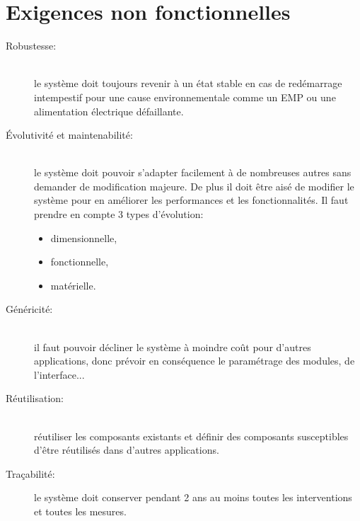 \section{Exigences non fonctionnelles}
    \begin{description}
        \item[Robustesse:]\hfill\\
            le système doit toujours revenir à un état
            stable en cas de redémarrage intempestif pour une cause
            environnementale comme un EMP ou une alimentation électrique
            défaillante.
    
        \item[Évolutivité et maintenabilité:]\hfill\\
            le système doit pouvoir
            s'adapter facilement à de nombreuses autres sans demander de
            modification majeure.
            De plus il doit être aisé de modifier le système pour en
            améliorer les performances et les fonctionnalités.
            Il faut prendre en compte 3 types d'évolution:
            \begin{itemize}
                \item dimensionnelle,
                \item fonctionnelle,
                \item matérielle.
            \end{itemize}

        \item[Généricité:]\hfill\\
            il faut pouvoir décliner le système à moindre
            coût pour d'autres applications, donc prévoir en conséquence
            le paramétrage des modules, de l'interface...

        \item[Réutilisation:]\hfill\\
            réutiliser les composants existants et
            définir des composants susceptibles d'être réutilisés dans
            d'autres applications.

        \item[Traçabilité:] le système doit conserver pendant 2 ans au
            moins toutes les interventions et toutes les mesures.
    \end{description}

